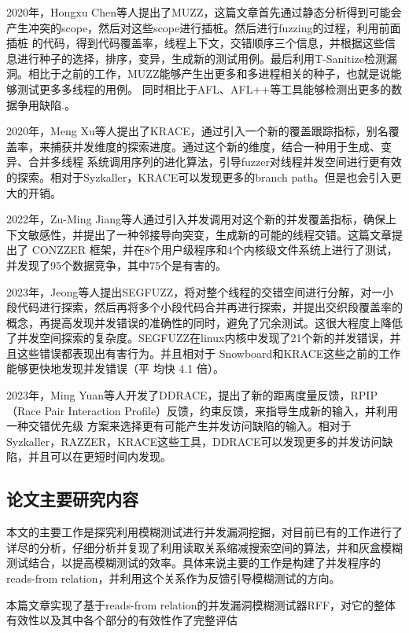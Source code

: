 2020年，Hongxu Chen\cite{chen2020muzz}等人提出了MUZZ，这篇文章首先通过静态分析得到可能会产生冲突的scope，然后对这些scope进行插桩。然后进行fuzzing的过程，利用前面插桩 的代码，得到代码覆盖率，线程上下文，交错顺序三个信息，并根据这些信息进行种子的选择，排序，变异，生成新的测试用例。最后利用T-Sanitize检测漏洞。相比于之前的工作，MUZZ能够产生出更多和多进程相关的种子，也就是说能够测试更多多线程的用例。 同时相比于AFL、AFL++\cite{fioraldi2020afl++}等工具能够检测出更多的数据争用缺陷.。

2020年，Meng Xu\cite{xu2020krace}等人提出了KRACE，通过引入一个新的覆盖跟踪指标，别名覆盖率，来捕获并发维度的探索进度。通过这个新的维度，结合一种用于生成、变异、合并多线程 系统调用序列的进化算法，引导fuzzer对线程并发空间进行更有效的探索。相对于Syzkaller，KRACE可以发现更多的branch path。但是也会引入更大的开销。 

2022年，Zu-Ming Jiang\cite{jiang2022context}等人通过引入并发调用对这个新的并发覆盖指标，确保上 下文敏感性，并提出了一种邻接导向突变，生成新的可能的线程交错。这篇文章提出了 CONZZER 框架，并在8个用户级程序和4个内核级文件系统上进行了测试，并发现了95个数据竞争，其中75个是有害的。 

2023年，Jeong等人提出SEGFUZZ\cite{jeong2023segfuzz}，将对整个线程的交错空间进行分解，对一小段代码进行探索，然后再将多个小段代码合并再进行探索，并提出交织段覆盖率的概念，再提高发现并发错误的准确性的同时，避免了冗余测试。这很大程度上降低了并发空间探索的复杂度。SEGFUZZ在linux内核中发现了21个新的并发错误，并且这些错误都表现出有害行为。并且相对于 Snowboard和KRACE这些之前的工作能够更快地发现并发错误（平 均快 4.1 倍）。 

2023年，Ming Yuan等人开发了DDRACE\cite{yuan2023ddrace}，提出了新的距离度量反馈，RPIP（Race Pair Interaction Profile）反馈，约束反馈，来指导生成新的输入，并利用一种交错优先级 方案来选择更有可能产生并发访问缺陷的输入。相对于Syzkaller，RAZZER，KRACE这些工具，DDRACE可以发现更多的并发访问缺陷，并且可以在更短时间内发现。


\subsection{论文主要研究内容}

本文的主要工作是探究利用模糊测试进行并发漏洞挖掘，对目前已有的工作进行了详尽的分析，仔细分析并复现了利用读取关系缩减搜索空间的算法，并和灰盒模糊测试结合，以提高模糊测试的效率。具体来说主要的工作是构建了并发程序的reads-from relation，并利用这个关系作为反馈引导模糊测试的方向。

本篇文章实现了基于reads-from relation的并发漏洞模糊测试器RFF，对它的整体有效性以及其中各个部分的有效性作了完整评估

